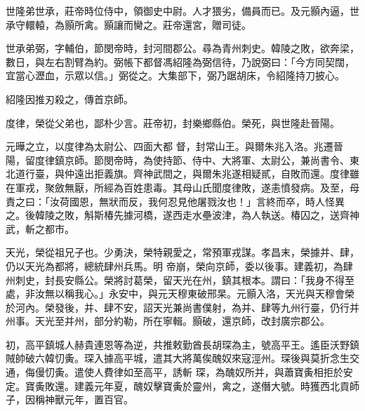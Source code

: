 \begin{pinyinscope}
 世隆弟世承，莊帝時位侍中，領御史中尉。人才猥劣，備員而已。及元顥內逼，世承守轘轅，為顥所禽。顥讓而臠之。莊帝還宮，贈司徒。



 世承弟弼，字輔伯，節閔帝時，封河間郡公。尋為青州刺史。韓陵之敗，欲奔梁，數日，與左右割臂為約。弼帳下都督馮紹隆為弼信待，乃說弼曰：「今方同契闊，宜當心瀝血，示眾以信。」弼從之。大集部下，弼乃踞胡床，令紹隆持刀披心。



 紹隆因推刃殺之，傳首京師。



 度律，榮從父弟也，鄙朴少言。莊帝初，封樂鄉縣伯。榮死，與世隆赴晉陽。



 元曄之立，以度律為太尉公、四面大都
 督，封常山王。與爾朱兆入洛。兆遷晉陽，留度律鎮京師。節閔帝時，為使持節、侍中、大將軍、太尉公，兼尚書令、東北道行臺，與仲遠出拒義旗。齊神武間之，與爾朱兆遂相疑貳，自敗而還。度律雖在軍戎，聚斂無厭，所經為百姓患毒。其母山氏聞度律敗，遂恚憤發病。及至，母責之曰：「汝荷國恩，無狀而反，我何忍見他屠戮汝也！」言終而卒，時人怪異之。後韓陵之敗，斛斯椿先據河橋，遂西走水壘波津，為人執送。椿囚之，送齊神武，斬之都市。



 天光，榮從祖兄子也。少勇決，榮特親愛之，常預軍戎謀。孝昌末，榮據并、肆，仍以天光為都將，總統肆州兵馬。明
 帝崩，榮向京師，委以後事。建義初，為肆州刺史，封長安縣公。榮將討葛榮，留天光在州，鎮其根本。謂曰：「我身不得至處，非汝無以稱我心。」永安中，與元天穆東破邢杲。元顥入洛，天光與天穆會榮於河內。榮發後，并、肆不安，詔天光兼尚書僕射，為并、肆等九州行臺，仍行并州事。天光至并州，部分約勒，所在寧輯。顥破，還京師，改封廣宗郡公。



 初，高平鎮城人赫貴連恩等為逆，共推敕勤酋長胡琛為主，號高平王。遙臣沃野鎮賊帥破六韓忉夤。琛入據高平城，遣其大將萬俟醜奴來寇涇州。琛後與莫折念生交通，侮僈忉夤。遣使人費律如至高平，誘斬
 琛，為醜奴所并，與蕭寶夤相拒於安定。寶夤敗還。建義元年夏，醜奴擊寶夤於靈州，禽之，遂僭大號。時獲西北貢師子，因稱神獸元年，置百官。




\end{pinyinscope}
